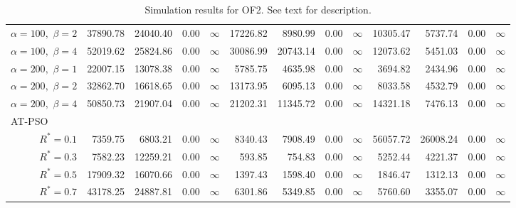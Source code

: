 \documentclass[12pt]{article}
\begin{document}
\begin{table}[ht]
{\begin{tabular}{r|rrrr|rrrr|rrrr}
  $\alpha = 100,$ $\beta =2$ & 37890.78 & 24040.40 & 0.00 & $\infty$ & 17226.82 & 8980.99 & 0.00 & $\infty$ & 10305.47 & 5737.74 & 0.00 & $\infty$ \\ 
  $\alpha = 100,$ $\beta =4$ & 52019.62 & 25824.86 & 0.00 & $\infty$ & 30086.99 & 20743.14 & 0.00 & $\infty$ & 12073.62 & 5451.03 & 0.00 & $\infty$ \\ 
  $\alpha = 200,$ $\beta =1$ & 22007.15 & 13078.38 & 0.00 & $\infty$ & 5785.75 & 4635.98 & 0.00 & $\infty$ & 3694.82 & 2434.96 & 0.00 & $\infty$ \\ 
  $\alpha = 200,$ $\beta =2$ & 32862.70 & 16618.65 & 0.00 & $\infty$ & 13173.95 & 6095.13 & 0.00 & $\infty$ & 8033.58 & 4532.79 & 0.00 & $\infty$ \\ 
  $\alpha = 200,$ $\beta =4$ & 50850.73 & 21907.04 & 0.00 & $\infty$ & 21202.31 & 11345.72 & 0.00 & $\infty$ & 14321.18 & 7476.13 & 0.00 & $\infty$ \\ 
\hline
\multicolumn{1}{l|}{AT-PSO} &&&&&&&&&&&&\\
  $R^* = 0.1$ & 7359.75 & 6803.21 & 0.00 & $\infty$ & 8340.43 & 7908.49 & 0.00 & $\infty$ & 56057.72 & 26008.24 & 0.00 & $\infty$ \\ 
  $R^* = 0.3$ & 7582.23 & 12259.21 & 0.00 & $\infty$ & 593.85 & 754.83 & 0.00 & $\infty$ & 5252.44 & 4221.37 & 0.00 & $\infty$ \\ 
  $R^* = 0.5$ & 17909.32 & 16070.66 & 0.00 & $\infty$ & 1397.43 & 1598.40 & 0.00 & $\infty$ & 1846.47 & 1312.13 & 0.00 & $\infty$ \\ 
  $R^* = 0.7$ & 43178.25 & 24887.81 & 0.00 & $\infty$ & 6301.86 & 5349.85 & 0.00 & $\infty$ & 5760.60 & 3355.07 & 0.00 & $\infty$ \\ 
   \hline
\end{tabular}
}
\caption{Simulation results for OF2. See text for description.}
\label{tab:psosim2}
\end{table}
\end{document}

